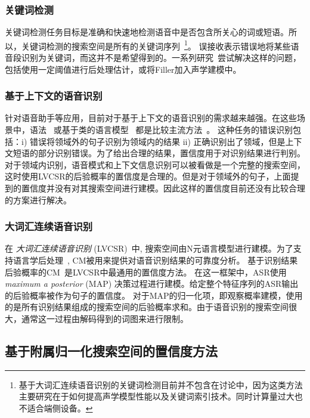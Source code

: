   \subsubsection{关键词检测}
    \label{Sec:kws-task}

    	关键词检测任务目标是准确和快速地检测语音中是否包含所关心的词或短语。所以，关键词检测的搜索空间是所有的关键词序列~\footnote{基于大词汇连续语音识别的关键词检测目前并不包含在讨论中，因为这类方法主要研究在于如何提高声学模型性能以及关键词索引技术。同时计算量过大也不适合端侧设备。}。 误接收表示错误地将某些语音段识别为关键词，而这并不是希望得到的。一系列研究~\cite{young1994detecting,chen2014small}尝试解决这样的问题，包括使用一定阈值进行后处理估计，或将Filler加入声学建模中。

  \subsubsection{基于上下文的语音识别}
  \label{Sec:task-task}

  针对语音助手等应用，目前对于基于上下文的语音识别的需求越来越强。在这些场景中，语法~\cite{woodland1994large} 或基于类的语言模型~\cite{ward1996class} 都是比较主流方法~\cite{vasserman2016contextual}。
  这种任务的错误识别包括：i) 错误将领域外的句子识别为领域内的结果 ii) 正确识别出了领域，但是上下文短语的部分识别错误。为了给出合理的结果，置信度用于对识别结果进行判别。对于领域内识别，语音模式和上下文信息识别可以被看做是一个完整的搜索空间，这时使用LVCSR的后验概率的置信度是合理的。但是对于领域外的句子，上面提到的置信度并没有对其搜索空间进行建模。因此这样的置信度目前还没有比较合理的方案进行解决。

  \subsubsection{大词汇连续语音识别}
  \label{Sec:lvcsr-task}

  在 {\em 大词汇连续语音识别} (LVCSR)~\cite{woodland1994large}中,  搜索空间由N元语言模型进行建模。为了支持语言学后处理~\cite{hakkani2006beyond}, CM被用来提供对语音识别结果的可靠度分析。
  基于识别结果后验概率的CM~\cite{wessel2001confidence}是LVCSR中最通用的置信度方法。
  在这一框架中，ASR使用 {\em maximum a posterior} (MAP) 决策过程进行建模。给定整个特征序列的ASR输出的后验概率被作为句子的置信度。 对于MAP的归一化项，即观察概率建模，使用的是所有识别结果组成的搜索空间的后验概率求和。由于语音识别的搜索空间很大，通常这一过程由解码得到的词图来进行限制。

  \subsection{基于附属归一化搜索空间的置信度方法}
  \label{Sec:norm-gragh}

